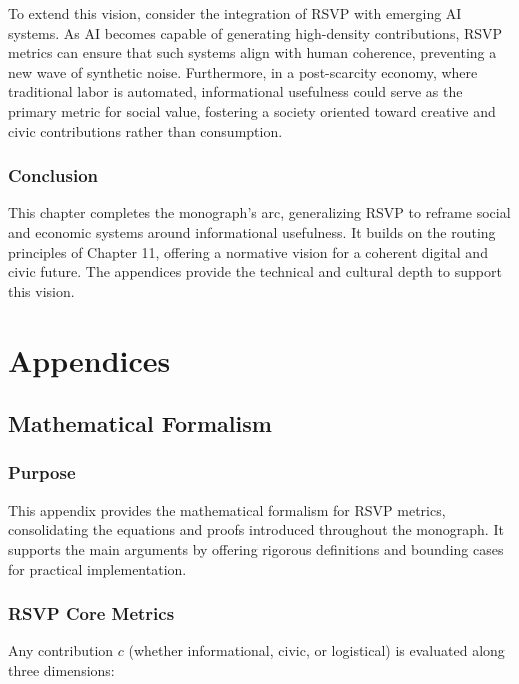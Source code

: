 \documentclass[openany]{book}
\begin{document}
To extend this vision, consider the integration of RSVP with emerging AI systems. As AI becomes capable of generating high-density contributions, RSVP metrics can ensure that such systems align with human coherence, preventing a new wave of synthetic noise. Furthermore, in a post-scarcity economy, where traditional labor is automated, informational usefulness could serve as the primary metric for social value, fostering a society oriented toward creative and civic contributions rather than consumption.

\section{Conclusion}

This chapter completes the monograph’s arc, generalizing RSVP to reframe social and economic systems around informational usefulness. It builds on the routing principles of Chapter 11, offering a normative vision for a coherent digital and civic future. The appendices provide the technical and cultural depth to support this vision.

\part{Appendices}

\appendix
\chapter{Mathematical Formalism}

\section{Purpose}

This appendix provides the mathematical formalism for RSVP metrics, consolidating the equations and proofs introduced throughout the monograph. It supports the main arguments by offering rigorous definitions and bounding cases for practical implementation.

\section{RSVP Core Metrics}

Any contribution $c$ (whether informational, civic, or logistical) is evaluated along three dimensions:
\end{document}
